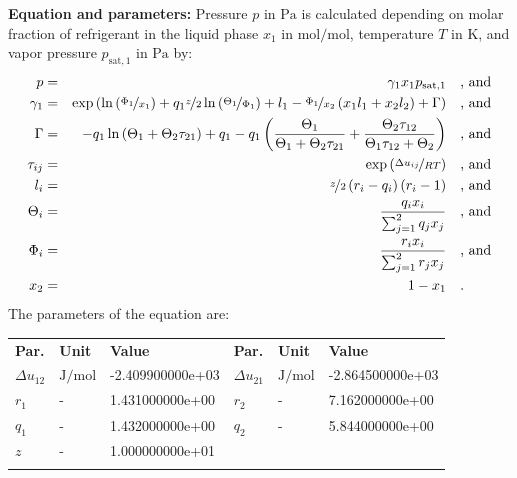 \textbf{Equation and parameters:}
\newline
%
Pressure $p$ in $\si{\pascal}$ is calculated depending on molar fraction of refrigerant in the liquid phase $x_1$ in $\si{\mole\per\mole}$, temperature $T$ in $\si{\kelvin}$, and vapor pressure $p_\mathrm{sat,1}$ in $\si{\pascal}$ by:
%
\begin{equation*}
\begin{split}
p &=& \gamma_1 x_1 p_\mathrm{sat,1} & \quad\text{, and} \\
\gamma_1 &=& \exp \left( \ln \left( \nicefrac{\Phi_1}{x_1} \right) + q_1 \nicefrac{z}{2} \ln \left( \nicefrac{\Theta_1}{\Phi_1} \right) + l_1 - \nicefrac{\Phi_1}{x_2} \left( x_1 l_1 + x_2 l_2 \right) + \Gamma \right) & \quad\text{, and} \\
\Gamma &=& - q_1 \ln \left( \Theta_1 + \Theta_2 \tau_{21} \right) + q_1 - q_1 \left( \frac{\Theta_1}{\Theta_1 + \Theta_2 \tau_{21}} + \frac{\Theta_2 \tau_{12}}{\Theta_1 \tau_{12} + \Theta_2} \right) & \quad\text{, and} \\
\tau_{ij} &=& \exp \left( \nicefrac{\Delta u_{ij}}{R T} \right) & \quad\text{, and} \\
l_i &=& \nicefrac{z}{2} \left( r_i - q_i \right) \left(r_i - 1 \right) & \quad\text{, and} \\
\Theta_i &=& \frac{q_i x_i}{\sum_{j=1}^{2} q_j x_j} & \quad\text{, and} \\
\Phi_i &=& \frac{r_i x_i}{\sum_{j=1}^{2} r_j x_j} & \quad\text{, and} \\
x_2 &=& 1 - x_1  & \quad\text{.} \\
\end{split}
\end{equation*}
%
The parameters of the equation are:
%
\begin{longtable}[l]{lll|lll}
\toprule
\addlinespace
\textbf{Par.} & \textbf{Unit} & \textbf{Value} &	\textbf{Par.} & \textbf{Unit} & \textbf{Value} \\
\addlinespace
\midrule
\endhead

\bottomrule
\endfoot
\bottomrule
\endlastfoot
\addlinespace

$\Delta u_{12}$ & $\si{\joule\per\mole}$ & -2.409900000e+03 & $\Delta u_{21}$ & $\si{\joule\per\mole}$ & -2.864500000e+03 \\
$r_{1}$ & - & 1.431000000e+00 & $r_{2}$ & - & 7.162000000e+00 \\
$q_{1}$ & - & 1.432000000e+00 & $q_{2}$ & - & 5.844000000e+00 \\
$z$ & - & 1.000000000e+01 & & &  \\

\addlinespace\end{longtable}

